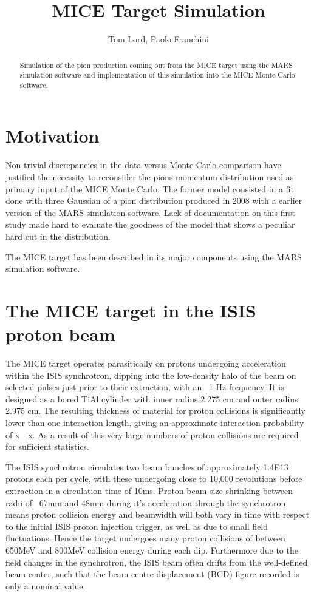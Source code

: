 \documentclass[a4paper,11pt]{article}
\title{MICE Target Simulation}
\author{Tom Lord, Paolo Franchini}
\begin{document}
\maketitle
\tableofcontents

\begin{abstract}
Simulation of the pion production coming out from the MICE target using the MARS simulation software and implementation of this simulation into the MICE Monte Carlo software.
\end{abstract}

\newpage

\section{Motivation}

Non trivial discrepancies in the data versus Monte Carlo comparison have justified the necessity to reconsider the pions momentum distribution used as primary input of the MICE Monte Carlo.
The former model consisted in a fit done with three Gaussian of a pion distribution produced in 2008 with a earlier version of the MARS simulation software. Lack of documentation on this first study made hard to evaluate the goodness of the model that shows a peculiar hard cut in the distribution.

The MICE target has been described in its major components using the MARS simulation software.
\section{The MICE target in the ISIS proton beam}

The MICE target operates parasitically on protons undergoing acceleration within the ISIS synchrotron, dipping into the low-density halo of the beam on selected pulses just prior to their extraction, with an ~1 Hz frequency. It is designed as a bored TiAl cylinder with inner radius 2.275 cm and outer radius 2.975 cm. The resulting thickness of material for proton collisions is significantly lower than one interaction length, giving an approximate interaction probability of x~~x. As a result of this,very large numbers of proton collisions are required for sufficient statistics. 

The ISIS synchrotron circulates two beam bunches of approximately 1.4E13 protons each per cycle, with these undergoing close to 10,000 revolutions before extraction in a circulation time of 10ms. Proton beam-size shrinking between radii of ~67mm and 48mm during it's acceleration through the synchrotron means proton collision energy and beamwidth will both vary in time with respect to the initial ISIS proton injection trigger, as well as due to small field fluctuations. Hence the target undergoes many proton collisions of between 650MeV and 800MeV collision energy during each dip. Furthermore due to the field changes in the synchrotron, the ISIS beam often drifts from the well-defined beam center, such that the beam centre displacement (BCD) figure recorded is only a nominal value. 
\end{document}

